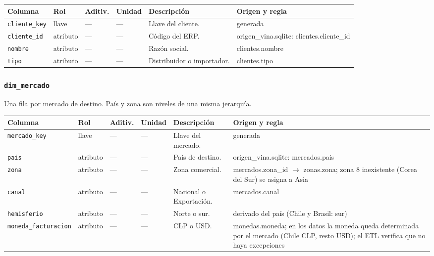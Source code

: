 {\footnotesize
\begin{longtable}{@{}>{\raggedright\arraybackslash}p{}>{\raggedright\arraybackslash}p{}>{\raggedright\arraybackslash}p{}>{\raggedright\arraybackslash}p{}>{\raggedright\arraybackslash}p{}>{\raggedright\arraybackslash}p{}@{}}
\toprule
Columna & Rol & Aditiv. & Unidad & Descripción & Origen y regla \\
\midrule
\endhead
\texttt{cliente\_key} & llave & — & — & Llave del cliente. & generada \\
\texttt{cliente\_id} & atributo & — & — & Código del ERP. & origen\_vina.\allowbreak{}sqlite: clientes.\allowbreak{}cliente\_id \\
\texttt{nombre} & atributo & — & — & Razón social. & clientes.\allowbreak{}nombre \\
\texttt{tipo} & atributo & — & — & Distribuidor o importador. & clientes.\allowbreak{}tipo \\
\bottomrule
\end{longtable}
}

\subsubsection*{\texttt{dim\_mercado}}
Una fila por mercado de destino. País y zona son niveles de una misma jerarquía.

{\footnotesize
\begin{longtable}{@{}>{\raggedright\arraybackslash}p{}>{\raggedright\arraybackslash}p{}>{\raggedright\arraybackslash}p{}>{\raggedright\arraybackslash}p{}>{\raggedright\arraybackslash}p{}>{\raggedright\arraybackslash}p{}@{}}
\toprule
Columna & Rol & Aditiv. & Unidad & Descripción & Origen y regla \\
\midrule
\endhead
\texttt{mercado\_key} & llave & — & — & Llave del mercado. & generada \\
\texttt{pais} & atributo & — & — & País de destino. & origen\_vina.\allowbreak{}sqlite: mercados.\allowbreak{}pais \\
\texttt{zona} & atributo & — & — & Zona comercial. & mercados.\allowbreak{}zona\_id $\rightarrow$ zonas.\allowbreak{}zona; zona 8 inexistente (Corea del Sur) se asigna a Asia \\
\texttt{canal} & atributo & — & — & Nacional o Exportación. & mercados.\allowbreak{}canal \\
\texttt{hemisferio} & atributo & — & — & Norte o sur. & derivado del país (Chile y Brasil: sur) \\
\texttt{moneda\_facturacion} & atributo & — & — & CLP o USD. & monedas.\allowbreak{}moneda; en los datos la moneda queda determinada por el mercado (Chile CLP, resto USD); el ETL verifica que no haya excepciones \\
\bottomrule
\end{longtable}
}
